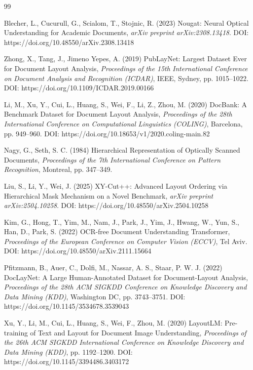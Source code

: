 \documentclass[11pt,twoside]{article}
\begin{document}
\begin{thebibliography}{99}

   Blecher, L., Cucurull, G., Scialom, T., Stojnic, R. (2023)
  Nougat: Neural Optical Understanding for Academic Documents,
  {\it arXiv preprint arXiv:2308.13418}.
  DOI: https://doi.org/10.48550/arXiv.2308.13418

   Zhong, X., Tang, J., Jimeno Yepes, A. (2019) PubLayNet:
  Largest Dataset Ever for Document Layout Analysis, {\it Proceedings of the 15th
  International Conference on Document Analysis and Recognition (ICDAR)}, IEEE,
  Sydney, pp. 1015--1022.
  DOI: https://doi.org/10.1109/ICDAR.2019.00166

   Li, M., Xu, Y., Cui, L., Huang, S., Wei, F., Li, Z., Zhou, M.
  (2020) DocBank: A Benchmark Dataset for Document Layout Analysis,
  {\it Proceedings of the 28th International Conference on Computational
  Linguistics (COLING)}, Barcelona, pp. 949--960.
  DOI: https://doi.org/10.18653/v1/2020.coling-main.82

   Nagy, G., Seth, S. C. (1984) Hierarchical Representation of
  Optically Scanned Documents, {\it Proceedings of the 7th International
  Conference on Pattern Recognition}, Montreal, pp. 347--349.

   Liu, S., Li, Y., Wei, J. (2025) XY-Cut++: Advanced Layout
  Ordering via Hierarchical Mask Mechanism on a Novel Benchmark,
  {\it arXiv preprint arXiv:2504.10258}.
  DOI: https://doi.org/10.48550/arXiv.2504.10258

   Kim, G., Hong, T., Yim, M., Nam, J., Park, J., Yim, J.,
  Hwang, W., Yun, S., Han, D., Park, S. (2022) OCR-free Document Understanding
  Transformer, {\it Proceedings of the European Conference on Computer Vision
  (ECCV)}, Tel Aviv.
  DOI: https://doi.org/10.48550/arXiv.2111.15664

   Pfitzmann, B., Auer, C., Dolfi, M., Nassar, A. S.,
  Staar, P. W. J. (2022) DocLayNet: A Large Human-Annotated Dataset for
  Document-Layout Analysis, {\it Proceedings of the 28th ACM SIGKDD Conference
  on Knowledge Discovery and Data Mining (KDD)}, Washington DC, pp. 3743--3751.
  DOI: https://doi.org/10.1145/3534678.3539043

   Xu, Y., Li, M., Cui, L., Huang, S., Wei, F., Zhou, M.
  (2020) LayoutLM: Pre-training of Text and Layout for Document Image
  Understanding, {\it Proceedings of the 26th ACM SIGKDD International
  Conference on Knowledge Discovery and Data Mining (KDD)}, pp. 1192--1200.
  DOI: https://doi.org/10.1145/3394486.3403172


\end{thebibliography}
\end{document}
